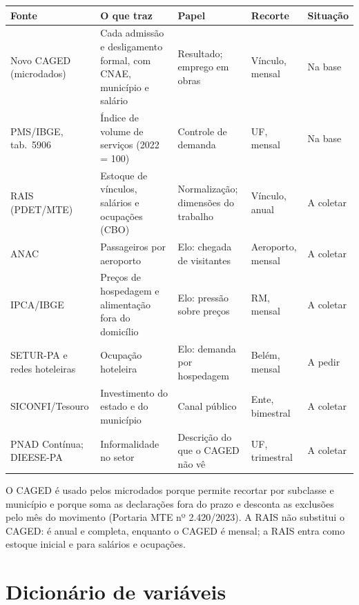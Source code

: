\documentclass[11pt,a4paper]{article}
\begin{document}
\begin{table}[H]
\centering\small
\begin{tabularx}{\linewidth}{>{\raggedright}p{3.1cm}LLp{2.3cm}l}
\toprule
\textbf{Fonte} & \textbf{O que traz} & \textbf{Papel} & \textbf{Recorte} & \textbf{Situação}\\
\midrule
Novo CAGED (microdados) & Cada admissão e desligamento formal, com CNAE, município e salário & Resultado; emprego em obras & Vínculo, mensal & Na base\\
PMS/IBGE, tab.\ 5906 & Índice de volume de serviços (2022 = 100) & Controle de demanda & UF, mensal & Na base\\
RAIS (PDET/MTE) & Estoque de vínculos, salários e ocupações (CBO) & Normalização; dimensões do trabalho & Vínculo, anual & A coletar\\
ANAC & Passageiros por aeroporto & Elo: chegada de visitantes & Aeroporto, mensal & A coletar\\
IPCA/IBGE & Preços de hospedagem e alimentação fora do domicílio & Elo: pressão sobre preços & RM, mensal & A coletar\\
SETUR-PA e redes hoteleiras & Ocupação hoteleira & Elo: demanda por hospedagem & Belém, mensal & A pedir\\
SICONFI/Tesouro & Investimento do estado e do município & Canal público & Ente, bimestral & A coletar\\
PNAD Contínua; DIEESE-PA & Informalidade no setor & Descrição do que o CAGED não vê & UF, trimestral & A coletar\\
\bottomrule
\end{tabularx}
\end{table}

O CAGED é usado pelos microdados porque permite recortar por subclasse e município e porque soma as
declarações fora do prazo e desconta as exclusões pelo mês do movimento (Portaria MTE nº 2.420/2023).
A RAIS não substitui o CAGED: é anual e completa, enquanto o CAGED é mensal; a RAIS entra como
estoque inicial e para salários e ocupações.

\section{Dicionário de variáveis}
\end{document}
